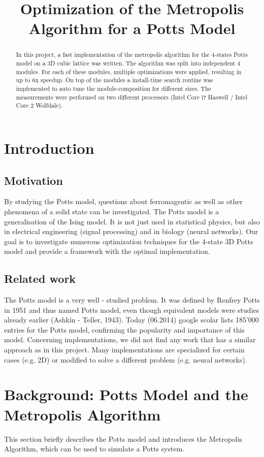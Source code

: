 \documentclass[letterpaper]{article}
\title{Optimization of the Metropolis Algorithm for a Potts Model}
\begin{document}
%
\maketitle
%


\begin{abstract}
In this project, a fast implementation of the metropolis algorithm for the 4-states Potts model on a 3D cubic lattice was written. The algorithm was split into independent 4 modules. For each of these modules, multiple optimizations were applied, resulting in up to $6$x speedup. On top of the modules a install-time search routine was implemented to auto tune the module-composition for different sizes. The measurements were performed on two different processors (Intel Core i7 Haswell / Intel Core 2 Wolfdale). 
\end{abstract}

\section{Introduction}\label{sec:intro}
\subsection{Motivation} 
By studying the Potts model, questions about ferromagentic as well as other phenomena of a solid state can be investigated. The Potts model is a generalisation of the Ising model. It is not just used in statistical physics, but also in electrical engineering (signal processing) and in biology (neural networks). Our goal is to investigate numerous optimization techniques for the 4-state 3D Potts model and provide a framework with the optimal implementation. 
\subsection{Related work}
The Potts model is a very well - studied problem. It was defined by Renfrey Potts in 1951 and thus named Potts model, even though equivalent models were studies already earlier (Ashkin - Teller, 1943). Today (06.2014) google scolar lists 185'000 entries for the Potts model, confirming the popularity and importance of this model. Concerning implementations, we did not find any work that has a similar approach as in this project. Many implementations are specialized for certain cases (e.g. 2D) or modified to solve a different problem (e.g. neural networks). 
\section{Background: Potts Model and the Metropolis Algorithm}\label{sec:background}
This section briefly describes the Potts model and introduces the Metropolis Algorithm, which can be used to simulate a Potts system.
\end{document}
